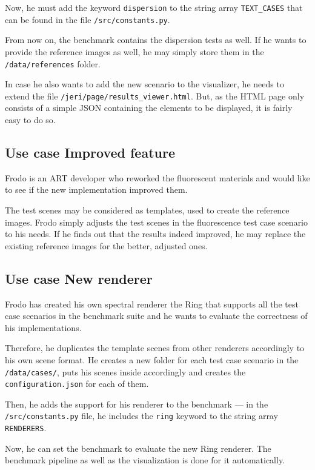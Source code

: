 Now, he must add the keyword \texttt{dispersion} to the string array \texttt{TEXT\_CASES} that can be found in the file \texttt{/src/constants.py}.

From now on, the benchmark contains the dispersion tests as well. If he wants to provide the reference images as well, he may simply store them in the \texttt{/data/references} folder.

In case he also wants to add the new scenario to the visualizer, he needs to extend the file \texttt{/jeri/page/results\_viewer.html}. But, as the HTML page only consists of a simple JSON containing the elements to be displayed, it is fairly easy to do so.

\subsection{Use case Improved feature}

Frodo is an ART developer who reworked the fluorescent materials and would like to see if the new implementation improved them.

The test scenes may be considered as templates, used to create the reference images. Frodo simply adjusts the test scenes in the fluorescence test case scenario to his needs. If he finds out that the results indeed improved, he may replace the existing reference images for the better, adjusted ones.

\subsection{Use case New renderer}

Frodo has created his own spectral renderer the Ring that supports all the test case scenarios in the benchmark suite and he wants to evaluate the correctness of his implementations.

Therefore, he duplicates the template scenes from other renderers accordingly to his own scene format. He creates a new folder for each test case scenario in the \texttt{/data/cases/}, puts his scenes inside accordingly and creates the \texttt{configuration.json} for each of them.

Then, he adds the support for his renderer to the benchmark --- in the \texttt{/src/constants.py} file, he includes the \texttt{ring} keyword to the string array \texttt{RENDERERS}.

Now, he can set the benchmark to evaluate the new Ring renderer. The benchmark pipeline as well as the visualization is done for it automatically.

